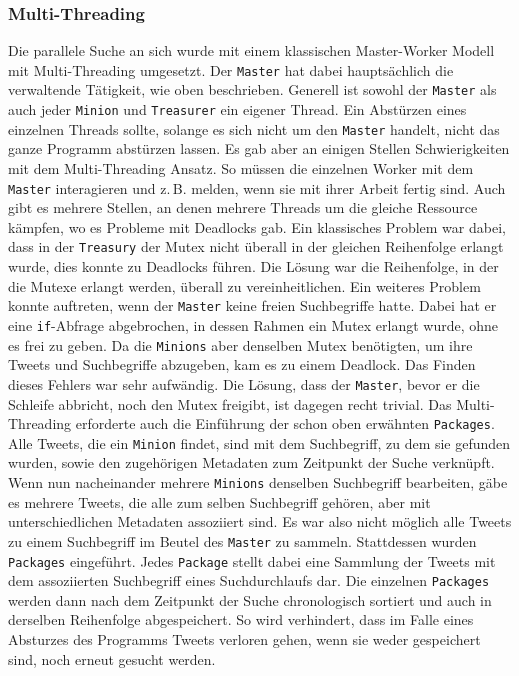 \subsubsection{Multi-Threading}
Die parallele Suche an sich wurde mit einem klassischen Master-Worker Modell mit Multi-Threading umgesetzt.
Der \texttt{Master} hat dabei hauptsächlich die verwaltende Tätigkeit, wie oben beschrieben.
Generell ist sowohl der \texttt{Master} als auch jeder \texttt{Minion} und \texttt{Treasurer} ein eigener Thread.
Ein Abstürzen eines einzelnen Threads sollte, solange es sich nicht um den \texttt{Master} handelt, nicht das ganze Programm abstürzen lassen.
Es gab aber an einigen Stellen Schwierigkeiten mit dem Multi-Threading Ansatz.
So müssen die einzelnen Worker mit dem \texttt{Master} interagieren und z.\,B. melden, wenn sie mit ihrer Arbeit fertig sind.
Auch gibt es mehrere Stellen, an denen mehrere Threads um die gleiche Ressource kämpfen, wo es Probleme mit Deadlocks gab.
Ein klassisches Problem war dabei, dass in der \texttt{Treasury} der Mutex nicht überall in der gleichen Reihenfolge erlangt wurde, dies konnte zu Deadlocks führen.
Die Lösung war die Reihenfolge, in der die Mutexe erlangt werden, überall zu vereinheitlichen.
Ein weiteres Problem konnte auftreten, wenn der \texttt{Master} keine freien Suchbegriffe hatte.
Dabei hat er eine \texttt{if}-Abfrage abgebrochen, in dessen Rahmen ein Mutex erlangt wurde, ohne es frei zu geben.
Da die \texttt{Minions} aber denselben Mutex benötigten, um ihre Tweets und Suchbegriffe abzugeben, kam es zu einem Deadlock. Das Finden dieses Fehlers war sehr aufwändig.
Die Lösung, dass der \texttt{Master}, bevor er die Schleife abbricht, noch den Mutex freigibt, ist dagegen recht trivial.
Das Multi-Threading erforderte auch die Einführung der schon oben erwähnten \texttt{Packages}.
Alle Tweets, die ein \texttt{Minion} findet, sind mit dem Suchbegriff, zu dem sie gefunden wurden, sowie den zugehörigen Metadaten zum Zeitpunkt der Suche verknüpft.
Wenn nun nacheinander mehrere \texttt{Minions} denselben Suchbegriff bearbeiten, gäbe es mehrere Tweets, die alle zum selben Suchbegriff gehören, aber mit unterschiedlichen Metadaten assoziiert sind.
Es war also nicht möglich alle Tweets zu einem Suchbegriff im Beutel des \texttt{Master} zu sammeln.
Stattdessen wurden \texttt{Packages} eingeführt.
Jedes \texttt{Package} stellt dabei eine Sammlung der Tweets mit dem assoziierten Suchbegriff eines Suchdurchlaufs dar.
Die einzelnen \texttt{Packages} werden dann nach dem Zeitpunkt der Suche chronologisch sortiert und auch in derselben Reihenfolge abgespeichert.
So wird verhindert, dass im Falle eines Absturzes des Programms Tweets verloren gehen, wenn sie weder gespeichert sind, noch erneut gesucht werden.

